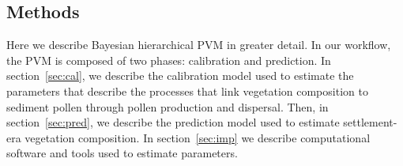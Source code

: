 \documentclass[12pt]{article}
\begin{document}



\subsection{Methods}

Here we describe Bayesian hierarchical PVM in greater detail. In our
workflow, the PVM is composed of two phases: calibration and
prediction. In section~\ref{sec:cal}, we describe the calibration
model used to estimate the parameters that describe the processes that
link vegetation composition to sediment pollen through pollen
production and dispersal. Then, in section~\ref{sec:pred}, we describe
the prediction model used to estimate settlement-era vegetation
composition. In section~\ref{sec:imp} we describe computational
software and tools used to estimate parameters.
\end{document}
